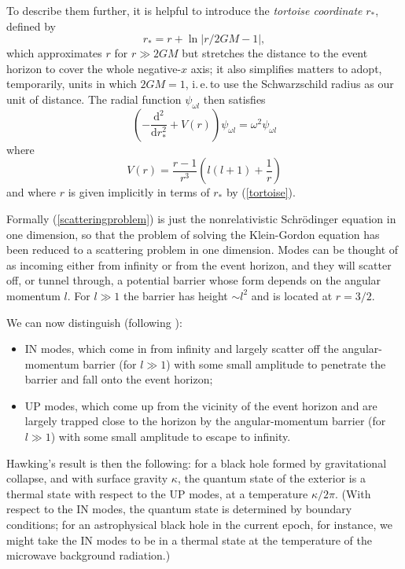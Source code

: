 \documentclass[12pt]{article}
\newcommand{\iec}{\mbox{i.\,e.\,}}
\newcommand{\be}{\begin{equation}}
\newcommand{\ee}{\end{equation}}
\begin{document}
To describe them further, it is helpful to introduce the \emph{tortoise coordinate} $r_*$, defined by
\be\label{tortoise}
r_* = r+ \ln |r/2GM - 1|,
\ee
which approximates $r$ for $r\gg 2GM$ but stretches the distance to the event horizon to cover the whole negative-$x$ axis; it also simplifies matters to adopt, temporarily, units in which $2GM=1$, \iec to use the Schwarzschild radius as our unit of distance. The radial function $\psi_{\omega l}$ then satisfies
\be\label{scatteringproblem}
\left( -\frac{\mathrm{d}^2}{\mathrm{d}r_*^2}+V(r)\right) \psi_{\omega l}  = \omega^2 \psi_{\omega l}  
\ee
where
\be\label{barrier}
V(r)=\frac{r-1}{r^3}\left(l(l+1) + \frac{1}{r}\right)
\ee
and where $r$ is given implicitly in terms of $r_*$ by (\ref{tortoise}). 

Formally (\ref{scatteringproblem}) is just the nonrelativistic Schr\"{o}dinger equation in one dimension, so that the problem of solving the Klein-Gordon equation has been reduced to a scattering problem in one dimension.  Modes can be thought of as incoming either from infinity or from the event horizon, and they will scatter off, or tunnel through, a potential barrier whose form depends on the angular momentum $l$. For $l\gg 1$ the barrier has height $\sim l^2$ and is located at $r=3/2$.  

We can now distinguish (following ):
\begin{itemize}
\item IN modes, which come in from infinity and largely scatter off the angular-momentum barrier (for $l\gg 1$) with some small amplitude to penetrate the barrier and fall onto the event horizon;
\item UP modes, which come up from the vicinity of the event horizon and are largely trapped close to the horizon by the angular-momentum barrier (for $l\gg 1$) with some small amplitude to escape to infinity.
\end{itemize}
 
 Hawking's result is then the following: for a black hole formed by gravitational collapse, and with surface gravity $\kappa$, the quantum state of the exterior is a thermal state with respect to the UP modes, at a temperature $\kappa/2\pi$. (With respect to the IN modes, the quantum state is determined by boundary conditions; for an astrophysical black hole in the current epoch, for instance, we might take the IN modes to be in a thermal state at the temperature of the microwave background radiation.)
 
\end{document}
